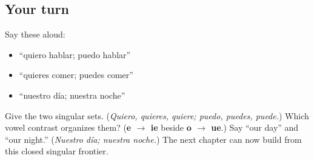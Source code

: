 \subsection*{Your turn}
Say these aloud:

\begin{itemize}
\raggedright
  \item “quiero hablar; puedo hablar”
  \item “quieres comer; puedes comer”
  \item “nuestro día; nuestra noche”
\end{itemize}

\begin{tcolorbox}[breakable,colback=teal!4,colframe=teal!35!black,title={Before you move on}]
Give the two singular sets. (\emph{Quiero, quieres, quiere; puedo, puedes, puede.}) Which vowel contrast organizes them? (\textbf{e $\to$ ie} beside \textbf{o $\to$ ue}.) Say “our day” and “our night.” (\emph{Nuestro día; nuestra noche.}) The next chapter can now build from this closed singular frontier.
\end{tcolorbox}
